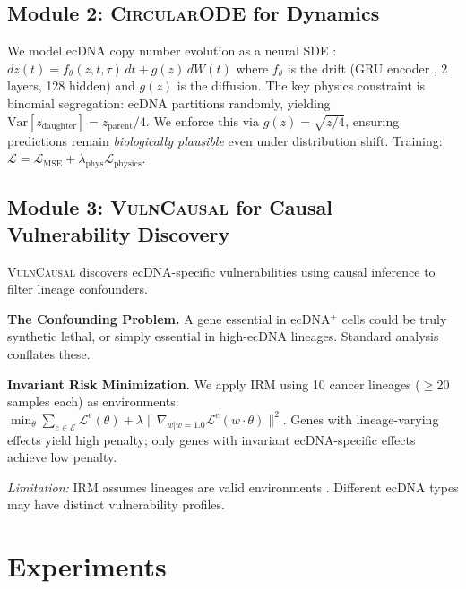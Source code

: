 \documentclass{article}
\newcommand{\circularode}{\textsc{CircularODE}}
\newcommand{\vulncausal}{\textsc{VulnCausal}}
\begin{document}
\subsection{Module 2: \circularode{} for Dynamics}
\label{sec:dynamics}

We model ecDNA copy number evolution as a neural SDE \citep{li_2020_neuralsde}:
$dz(t) = f_\theta(z, t, \tau) \, dt + g(z) \, dW(t)$
where $f_\theta$ is the drift (GRU encoder \citep{cho_2014_gru}, 2 layers, 128 hidden) and $g(z)$ is the diffusion. The key physics constraint is binomial segregation: ecDNA partitions randomly, yielding $\text{Var}[z_{\text{daughter}}] = z_{\text{parent}}/4$. We enforce this via $g(z) = \sqrt{z/4}$, ensuring predictions remain \textit{biologically plausible} even under distribution shift. Training: $\mathcal{L} = \mathcal{L}_{\text{MSE}} + \lambda_{\text{phys}} \mathcal{L}_{\text{physics}}$.

\subsection{Module 3: \vulncausal{} for Causal Vulnerability Discovery}
\label{sec:vulnerability}

\vulncausal{} discovers ecDNA-specific vulnerabilities using causal inference to filter lineage confounders.

\textbf{The Confounding Problem.} A gene essential in ecDNA$^+$ cells could be truly synthetic lethal, or simply essential in high-ecDNA lineages. Standard analysis conflates these.

\textbf{Invariant Risk Minimization.} We apply IRM \citep{arjovsky_2019_irm} using 10 cancer lineages ($\geq$20 samples each) as environments:
$\min_\theta \sum_{e \in \mathcal{E}} \mathcal{L}^e(\theta) + \lambda \|\nabla_{w|w=1.0} \mathcal{L}^e(w \cdot \theta)\|^2$.
Genes with lineage-varying effects yield high penalty; only genes with invariant ecDNA-specific effects achieve low penalty.

\textit{Limitation:} IRM assumes lineages are valid environments \citep{rosenfeld_2021_irm_risks}. Different ecDNA types may have distinct vulnerability profiles.


\section{Experiments}
\label{sec:experiments}
\end{document}

